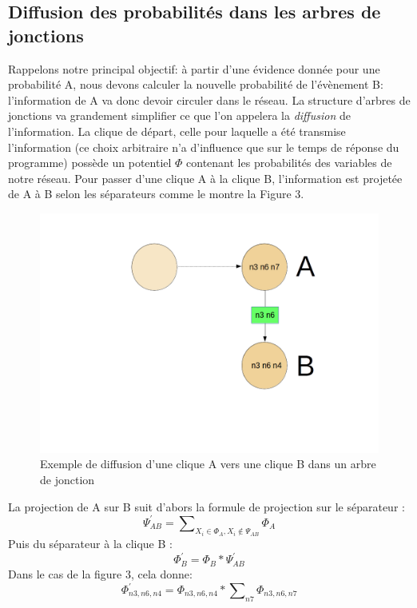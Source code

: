 \documentclass[a4paper]{article}
\begin{document}
  \subsection{Diffusion des probabilités dans les arbres de jonctions}
Rappelons notre principal objectif: à partir d'une évidence donnée pour une probabilité A, nous devons calculer la nouvelle probabilité de l'évènement B: l'information de A va donc devoir circuler dans le réseau. La 
structure d'arbres de jonctions va grandement simplifier ce que l'on appelera la \textit{diffusion} de l'information. La clique de départ, celle pour laquelle  a été transmise l'information
(ce choix arbitraire n'a d'influence que sur le temps de réponse du programme) possède un potentiel $\Phi$ contenant les probabilités des variables de notre réseau. Pour passer d'une clique A à la clique B, 
l'information est projetée de A à B selon les séparateurs comme le montre la Figure 3. 
 \begin{figure}[h!]
  \includegraphics[width=\linewidth]{Images/Diff_Jt.png}
  \caption{Exemple de diffusion d'une clique A vers une clique B dans un arbre de jonction}
  \label{fig:Diff_Jt}
 \end{figure}
\par \medbreak
La projection de A sur B suit d'abors la formule de projection sur le séparateur :\\ $$\Psi_{AB}^{'} = \sum\nolimits_{X_i \in \Phi_{A}, X_i \notin \Psi_{AB}} \Phi_{A}$$  Puis du séparateur à la clique B :\\
$$\Phi_{B}^{'} = \Phi_{B} * \Psi_{AB}^{'}$$ Dans le cas de la figure 3, cela donne: \\
$$\Phi_{n3,n6,n4}^{'} = \Phi_{n3, n6, n4} * \sum\nolimits_{n7} \Phi_{n3, n6, n7}$$\\
\end{document}
